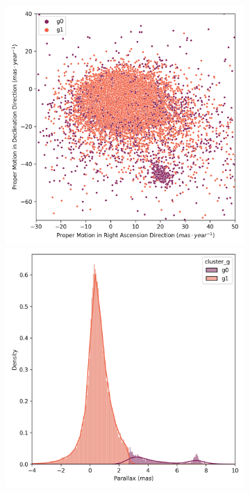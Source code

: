 \documentclass[preprint,12pt,authoryear]{elsarticle}
\begin{document}
\begin{figure}[!htbp]
  \centering
  \begin{subfigure}[b]{0.3\textwidth}
    \centering
      \includegraphics[width=\textwidth]{../figures/kmeans/kmeans_n2_pm_melotte_22.png}
      \includegraphics[width=\textwidth]{../figures/kmeans/kmeans_n2_parallax_melotte_22.png}

\end{subfigure}
\end{figure}
\end{document}

